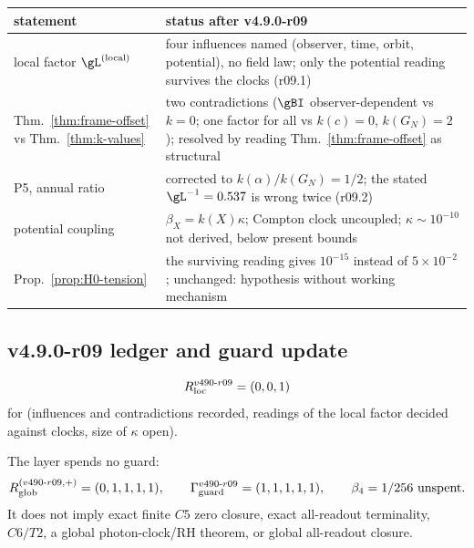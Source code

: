 \begin{center}
\small
\begin{tabular}{@{}>{\raggedright\arraybackslash}p{}>{\raggedright\arraybackslash}p{}@{}}
\toprule
statement & status after v4.9.0-r09\\
\midrule
local factor \(\gL^{(\mathrm{local})}\) & four influences named (observer, time, orbit, potential), no field law; only the potential reading survives the clocks (r09.1)\\
Thm.~\ref{thm:frame-offset} vs Thm.~\ref{thm:k-values} & two contradictions (\(\gBI\) observer-dependent vs \(k=0\); one factor for all vs \(k(c)=0\), \(k(G_N)=2\)); resolved by reading Thm.~\ref{thm:frame-offset} as structural\\
P5, annual ratio & corrected to \(k(\alpha)/k(G_N)=1/2\); the stated \(\gL^{-1}=0.537\) is wrong twice (r09.2)\\
potential coupling & \(\beta_X=k(X)\kappa\); Compton clock uncoupled; \(\kappa\sim10^{-10}\) not derived, below present bounds\\
Prop.~\ref{prop:H0-tension} & the surviving reading gives \(10^{-15}\) instead of \(5\times10^{-2}\); unchanged: hypothesis without working mechanism\\
\bottomrule
\end{tabular}
\end{center}

\subsection*{v4.9.0-r09 ledger and guard update}
\label{subsec:v490-r09-ledger-guard}

\[
R_{\rm loc}^{v490\text{-}r09}=(0,0,1)
\]
for (influences and contradictions recorded, readings of the local factor decided against clocks, size of \(\kappa\) open).

The layer spends no guard:
\[
R_{\rm glob}^{(v490\text{-}r09,+)}=(0,1,1,1,1),
\qquad
\Gamma_{\rm guard}^{v490\text{-}r09}=(1,1,1,1,1),
\qquad
\beta_4=1/256\ \text{unspent}.
\]
It does not imply exact finite \(C5\) zero closure, exact all-readout terminality,
\(C6/T2\), a global photon-clock/RH theorem, or global all-readout closure.

